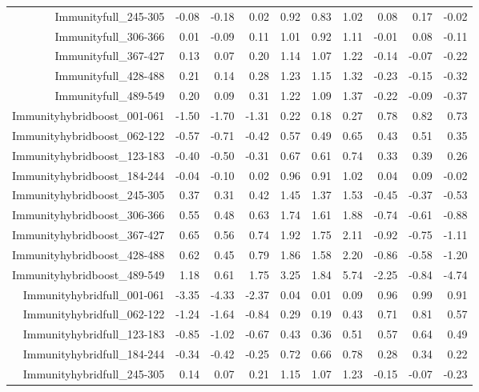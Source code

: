 \begin{table}[ht]
\begin{tabular}{rrrrrrrrrr}
  Immunityfull\_245-305 & -0.08 & -0.18 & 0.02 & 0.92 & 0.83 & 1.02 & 0.08 & 0.17 & -0.02 \\ 
  Immunityfull\_306-366 & 0.01 & -0.09 & 0.11 & 1.01 & 0.92 & 1.11 & -0.01 & 0.08 & -0.11 \\ 
  Immunityfull\_367-427 & 0.13 & 0.07 & 0.20 & 1.14 & 1.07 & 1.22 & -0.14 & -0.07 & -0.22 \\ 
  Immunityfull\_428-488 & 0.21 & 0.14 & 0.28 & 1.23 & 1.15 & 1.32 & -0.23 & -0.15 & -0.32 \\ 
  Immunityfull\_489-549 & 0.20 & 0.09 & 0.31 & 1.22 & 1.09 & 1.37 & -0.22 & -0.09 & -0.37 \\ 
  Immunityhybridboost\_001-061 & -1.50 & -1.70 & -1.31 & 0.22 & 0.18 & 0.27 & 0.78 & 0.82 & 0.73 \\ 
  Immunityhybridboost\_062-122 & -0.57 & -0.71 & -0.42 & 0.57 & 0.49 & 0.65 & 0.43 & 0.51 & 0.35 \\ 
  Immunityhybridboost\_123-183 & -0.40 & -0.50 & -0.31 & 0.67 & 0.61 & 0.74 & 0.33 & 0.39 & 0.26 \\ 
  Immunityhybridboost\_184-244 & -0.04 & -0.10 & 0.02 & 0.96 & 0.91 & 1.02 & 0.04 & 0.09 & -0.02 \\ 
  Immunityhybridboost\_245-305 & 0.37 & 0.31 & 0.42 & 1.45 & 1.37 & 1.53 & -0.45 & -0.37 & -0.53 \\ 
  Immunityhybridboost\_306-366 & 0.55 & 0.48 & 0.63 & 1.74 & 1.61 & 1.88 & -0.74 & -0.61 & -0.88 \\ 
  Immunityhybridboost\_367-427 & 0.65 & 0.56 & 0.74 & 1.92 & 1.75 & 2.11 & -0.92 & -0.75 & -1.11 \\ 
  Immunityhybridboost\_428-488 & 0.62 & 0.45 & 0.79 & 1.86 & 1.58 & 2.20 & -0.86 & -0.58 & -1.20 \\ 
  Immunityhybridboost\_489-549 & 1.18 & 0.61 & 1.75 & 3.25 & 1.84 & 5.74 & -2.25 & -0.84 & -4.74 \\ 
  Immunityhybridfull\_001-061 & -3.35 & -4.33 & -2.37 & 0.04 & 0.01 & 0.09 & 0.96 & 0.99 & 0.91 \\ 
  Immunityhybridfull\_062-122 & -1.24 & -1.64 & -0.84 & 0.29 & 0.19 & 0.43 & 0.71 & 0.81 & 0.57 \\ 
  Immunityhybridfull\_123-183 & -0.85 & -1.02 & -0.67 & 0.43 & 0.36 & 0.51 & 0.57 & 0.64 & 0.49 \\ 
  Immunityhybridfull\_184-244 & -0.34 & -0.42 & -0.25 & 0.72 & 0.66 & 0.78 & 0.28 & 0.34 & 0.22 \\ 
  Immunityhybridfull\_245-305 & 0.14 & 0.07 & 0.21 & 1.15 & 1.07 & 1.23 & -0.15 & -0.07 & -0.23 \\ 

\end{tabular}
\end{table}
